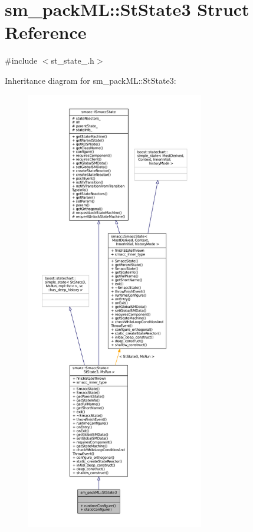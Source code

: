 \hypertarget{structsm__packML_1_1StState3}{}\section{sm\+\_\+pack\+ML\+:\+:St\+State3 Struct Reference}
\label{structsm__packML_1_1StState3}


{\ttfamily \#include $<$st\+\_\+state\+\_.\+h$>$}



Inheritance diagram for sm\+\_\+pack\+ML\+:\+:St\+State3\+:
\nopagebreak
\begin{figure}[H]
\begin{center}
\leavevmode
\includegraphics[height=550pt]{structsm__packML_1_1StState3__inherit__graph}
\end{center}
\end{figure}


